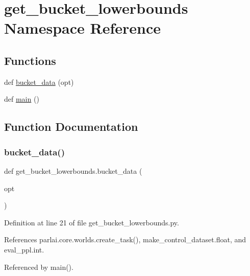 \hypertarget{namespaceget__bucket__lowerbounds}{}\section{get\+\_\+bucket\+\_\+lowerbounds Namespace Reference}
\label{namespaceget__bucket__lowerbounds}
\subsection*{Functions}
\begin{DoxyCompactItemize}
\item 
def \hyperlink{namespaceget__bucket__lowerbounds_a285c382c910c7580ec319f776c3f5bb6}{bucket\+\_\+data} (opt)
\item 
def \hyperlink{namespaceget__bucket__lowerbounds_a1ef6ff2ea96df8bffc36ee91f108e3d2}{main} ()
\end{DoxyCompactItemize}


\subsection{Function Documentation}
\mbox{\label{namespaceget__bucket__lowerbounds_a285c382c910c7580ec319f776c3f5bb6}} 
\subsubsection{\texorpdfstring{bucket\+\_\+data()}{bucket\_data()}}
{\footnotesize\ttfamily def get\+\_\+bucket\+\_\+lowerbounds.\+bucket\+\_\+data (\begin{DoxyParamCaption}\item[{}]{opt }\end{DoxyParamCaption})}



Definition at line 21 of file get\+\_\+bucket\+\_\+lowerbounds.\+py.



References parlai.\+core.\+worlds.\+create\+\_\+task(), make\+\_\+control\+\_\+dataset.\+float, and eval\+\_\+ppl.\+int.



Referenced by main().

